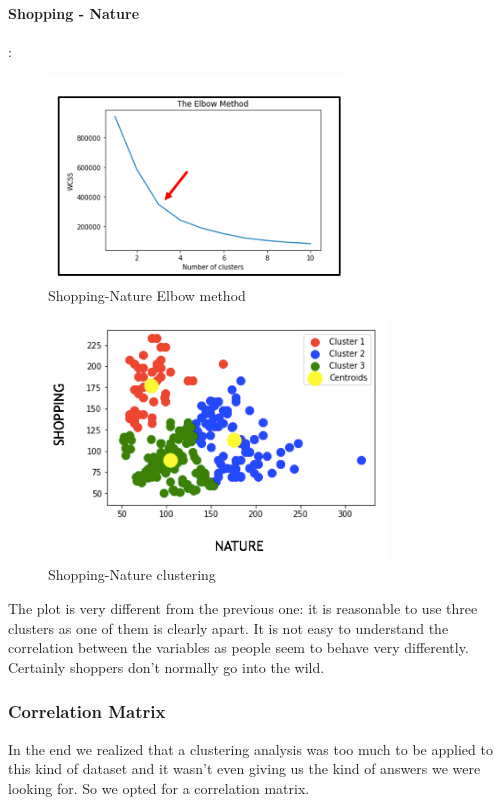 \paragraph*{Shopping - Nature}:
\begin{figure}[H]
\centering
\includegraphics[width=0.7\textwidth]{Img/3_elbow.png}
\caption{Shopping-Nature Elbow method}
\end{figure}
\begin{figure}[H]
\centering
\hspace{-1.8cm}
\includegraphics[width=0.8\textwidth]{Img/3_cluster.png}
\caption{Shopping-Nature clustering}
\end{figure}

\noindent The plot is very different from the previous one: it is reasonable to use three clusters as one of them is clearly apart. It is not easy to understand the correlation between the variables as people seem to behave very differently. Certainly shoppers don't normally go into the wild.
\clearpage

\subsubsection{Correlation Matrix}
In the end we realized that a clustering analysis was too much to be applied to this kind of dataset and it wasn't even giving us the kind of answers we were looking for. So we opted for a correlation matrix.


